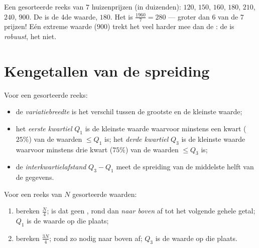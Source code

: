 \begin{example}\label{ex:g10:stats:median}
Een gesorteerde reeks van $7$ huizenprijzen (in duizenden): $120$, $150$,
$160$, $180$, $210$, $240$, $900$. De  is de $4$de waarde, $180$. Het
 is $\frac{1960}{7} = 280$ --- groter dan $6$ van de $7$ prijzen!
Eén extreme waarde ($900$) trekt het  veel harder mee dan de
: de  is \emph{robuust}, het  niet.
\end{example}

\section{Kengetallen van de spreiding}

\begin{definition}\label{def:g10:stats:quartiles}
Voor een gesorteerde reeks:
\begin{itemize}
  \item de \emph{variatiebreedte} is het verschil
        tussen de grootste en de kleinste waarde;
  \item het \emph{eerste kwartiel} $Q_1$ is de kleinste
        waarde waarvoor minstens een kwart ($25\%$) van de waarden $\leq Q_1$
        is; het \emph{derde kwartiel} $Q_3$ is de kleinste waarde waarvoor
        minstens drie kwart ($75\%$) van de waarden $\leq Q_3$ is;
  \item de \emph{interkwartielafstand}
        $Q_3 - Q_1$ meet de spreiding van de middelste helft van de gegevens.
\end{itemize}
\end{definition}

\begin{method}\label{met:g10:stats:quartiles}
Voor een reeks van $N$ gesorteerde waarden:
\begin{enumerate}
  \item bereken $\frac N4$; is dat geen , rond dan \emph{naar
        boven} af tot het volgende gehele getal; $Q_1$ is de waarde op die
        plaats;
  \item bereken $\frac{3N}{4}$; rond zo nodig naar boven af; $Q_3$ is de
        waarde op die plaats.
\end{enumerate}
\end{method}

